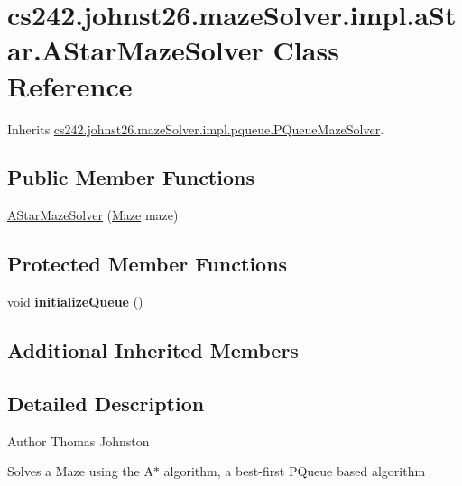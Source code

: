 \hypertarget{classcs242_1_1johnst26_1_1maze_solver_1_1impl_1_1a_star_1_1_a_star_maze_solver}{\section{cs242.\-johnst26.\-maze\-Solver.\-impl.\-a\-Star.\-A\-Star\-Maze\-Solver Class Reference}
\label{classcs242_1_1johnst26_1_1maze_solver_1_1impl_1_1a_star_1_1_a_star_maze_solver}
}


Inherits \hyperlink{classcs242_1_1johnst26_1_1maze_solver_1_1impl_1_1pqueue_1_1_p_queue_maze_solver}{cs242.\-johnst26.\-maze\-Solver.\-impl.\-pqueue.\-P\-Queue\-Maze\-Solver}.

\subsection*{Public Member Functions}
\begin{DoxyCompactItemize}
\item 
\hyperlink{classcs242_1_1johnst26_1_1maze_solver_1_1impl_1_1a_star_1_1_a_star_maze_solver_a587baf3a9b05a2f92663fbdc307a75b7}{A\-Star\-Maze\-Solver} (\hyperlink{interfacecs242_1_1johnst26_1_1maze_1_1_maze}{Maze} maze)
\end{DoxyCompactItemize}
\subsection*{Protected Member Functions}
\begin{DoxyCompactItemize}
\item 
\hypertarget{classcs242_1_1johnst26_1_1maze_solver_1_1impl_1_1a_star_1_1_a_star_maze_solver_a08305be087ae6a3e759267f80b4b29ac}{void {\bfseries initialize\-Queue} ()}\label{classcs242_1_1johnst26_1_1maze_solver_1_1impl_1_1a_star_1_1_a_star_maze_solver_a08305be087ae6a3e759267f80b4b29ac}

\end{DoxyCompactItemize}
\subsection*{Additional Inherited Members}


\subsection{Detailed Description}
\begin{DoxyAuthor}{Author}
Thomas Johnston
\end{DoxyAuthor}
Solves a Maze using the A$\ast$ algorithm, a best-\/first P\-Queue based algorithm 

